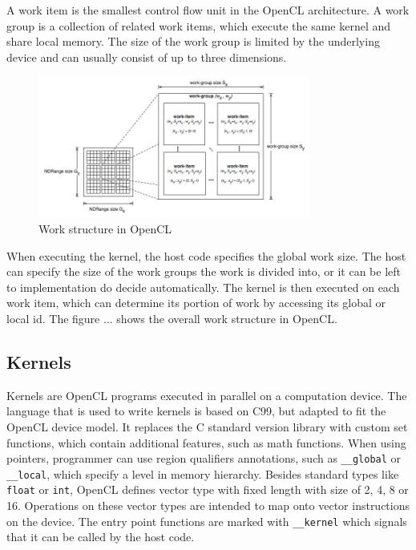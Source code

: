 \documentclass{l4proj}
\begin{document}
A work item is the smallest control flow unit in the OpenCL architecture. A work group is a 
collection of related work items, which execute the same kernel and share local memory.
The size of the work group is limited by the underlying device and can usually consist of up to 
three dimensions.

\begin{figure}
\centering
\includegraphics[width=0.8\textwidth]{images/opencl.jpg}
\caption{Work structure in OpenCL ~\protect\footnotemark}
\label{fig:opencl}
\end{figure}

When executing the kernel, the host code specifies the global work size. The host can specify 
the size of the work groups the work is divided into, or it can be left to implementation do decide
automatically. The kernel is then executed on each work item, which can determine its portion 
of work by accessing its global or local id. The figure ... shows the overall work structure in OpenCL.

\subsection{Kernels}

Kernels are OpenCL programs executed in parallel on a computation device. The language that is
used to write kernels is based on C99, but adapted to fit the OpenCL device model. It replaces 
the C standard version library with custom set functions, which contain additional features, such as 
math functions. When using pointers, programmer can use region qualifiers annotations, such as
\texttt{\_\_global} or \texttt{\_\_local}, which specify a level in memory hierarchy. Besides standard
types like \texttt{float} or \texttt{int}, OpenCL defines vector type with fixed length with size
of 2, 4, 8 or 16. Operations on these vector types are intended to map onto vector instructions on the device.
The entry point functions are marked with \texttt{\_\_kernel} which signals that it can be called by the host code.
\end{document}
